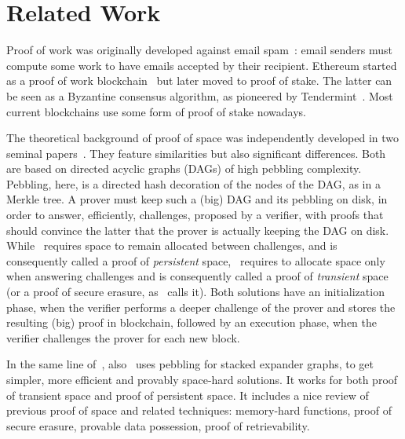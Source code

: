 \section{Related Work}\label{sec:related_work}

Proof of work was originally developed against email spam~\cite{DworkN92}:
email senders must compute some
work to have emails accepted by their recipient.
Ethereum started as a proof of work blockchain~\cite{AntonopoulosW18} but later
moved to proof of stake. The latter can be seen as a
Byzantine consensus algorithm, as pioneered by Tendermint~\cite{Kwon14}.
Most current blockchains use some form of proof of stake nowadays.

The theoretical background of proof of space was independently developed
in two seminal papers~\cite{AtenieseBFG14,DziembowskiFKP15}.
They feature similarities but also significant differences. Both are based
on directed acyclic graphs (DAGs) of high pebbling complexity.
Pebbling, here, is a directed hash decoration of the nodes of the DAG, as in
a Merkle tree.
A prover must keep such a (big) DAG and its pebbling on disk, in order to answer, efficiently,
challenges, proposed by a verifier, with proofs that should convince the latter that
the prover is actually keeping the DAG on disk.
While~\cite{DziembowskiFKP15} requires space to remain allocated between challenges,
and is consequently called a proof of \emph{persistent} space, \cite{AtenieseBFG14}~requires
to allocate space only when answering challenges and is consequently called
a proof of \emph{transient} space (or a proof of secure erasure, as~\cite{DziembowskiFKP15} calls it).
Both solutions have an initialization phase, when the verifier performs a deeper challenge
of the prover and stores the resulting (big) proof in blockchain, followed by an execution phase,
when the verifier challenges the prover for each new block.

In the same line of~\cite{AtenieseBFG14,DziembowskiFKP15}, also~\cite{RenD16} uses
pebbling for stacked expander graphs, to get simpler, more efficient and
provably space-hard solutions.
It works for both proof of transient space and proof of persistent space.
It includes a nice review of previous proof of space
and related techniques: memory-hard functions, proof of secure erasure, provable data possession,
proof of retrievability.


